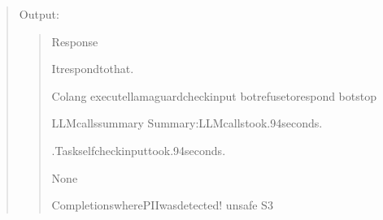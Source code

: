 \documentclass[letterpaper,11pt,english]{sphinxmanual}
\begin{document}
\begin{quote}

\sphinxAtStartPar
Output:
\begin{quote}

\begin{sphinxVerbatim}[commandchars=\\\{\}]
Response
\PYGZhy{}\PYGZhy{}\PYGZhy{}\PYGZhy{}\PYGZhy{}\PYGZhy{}\PYGZhy{}\PYGZhy{}\PYGZhy{}\PYGZhy{}\PYGZhy{}\PYGZhy{}\PYGZhy{}\PYGZhy{}\PYGZhy{}\PYGZhy{}\PYGZhy{}\PYGZhy{}\PYGZhy{}\PYGZhy{}\PYGZhy{}\PYGZhy{}\PYGZhy{}\PYGZhy{}\PYGZhy{}\PYGZhy{}\PYGZhy{}\PYGZhy{}\PYGZhy{}\PYGZhy{}\PYGZhy{}\PYGZhy{}\PYGZhy{}\PYGZhy{}\PYGZhy{}\PYGZhy{}\PYGZhy{}\PYGZhy{}\PYGZhy{}\PYGZhy{}


Itrespondtothat.


Colang
\PYGZhy{}\PYGZhy{}\PYGZhy{}\PYGZhy{}\PYGZhy{}\PYGZhy{}\PYGZhy{}\PYGZhy{}\PYGZhy{}\PYGZhy{}\PYGZhy{}\PYGZhy{}\PYGZhy{}\PYGZhy{}\PYGZhy{}\PYGZhy{}\PYGZhy{}\PYGZhy{}\PYGZhy{}\PYGZhy{}\PYGZhy{}\PYGZhy{}\PYGZhy{}\PYGZhy{}\PYGZhy{}\PYGZhy{}\PYGZhy{}\PYGZhy{}\PYGZhy{}\PYGZhy{}\PYGZhy{}\PYGZhy{}\PYGZhy{}\PYGZhy{}\PYGZhy{}\PYGZhy{}\PYGZhy{}\PYGZhy{}\PYGZhy{}\PYGZhy{}
executellama\PYGZus{}guard\PYGZus{}check\PYGZus{}input
botrefusetorespond
botstop



LLMcallssummary
\PYGZhy{}\PYGZhy{}\PYGZhy{}\PYGZhy{}\PYGZhy{}\PYGZhy{}\PYGZhy{}\PYGZhy{}\PYGZhy{}\PYGZhy{}\PYGZhy{}\PYGZhy{}\PYGZhy{}\PYGZhy{}\PYGZhy{}\PYGZhy{}\PYGZhy{}\PYGZhy{}\PYGZhy{}\PYGZhy{}\PYGZhy{}\PYGZhy{}\PYGZhy{}\PYGZhy{}\PYGZhy{}\PYGZhy{}\PYGZhy{}\PYGZhy{}\PYGZhy{}\PYGZhy{}\PYGZhy{}\PYGZhy{}\PYGZhy{}\PYGZhy{}\PYGZhy{}\PYGZhy{}\PYGZhy{}\PYGZhy{}\PYGZhy{}\PYGZhy{}
Summary:LLMcallstook.94seconds.

.Taskself\PYGZus{}check\PYGZus{}inputtook.94seconds.

None


CompletionswherePIIwasdetected!
\PYGZhy{}\PYGZhy{}\PYGZhy{}\PYGZhy{}\PYGZhy{}\PYGZhy{}\PYGZhy{}\PYGZhy{}\PYGZhy{}\PYGZhy{}\PYGZhy{}\PYGZhy{}\PYGZhy{}\PYGZhy{}\PYGZhy{}\PYGZhy{}\PYGZhy{}\PYGZhy{}\PYGZhy{}\PYGZhy{}\PYGZhy{}\PYGZhy{}\PYGZhy{}\PYGZhy{}\PYGZhy{}\PYGZhy{}\PYGZhy{}\PYGZhy{}\PYGZhy{}\PYGZhy{}\PYGZhy{}\PYGZhy{}\PYGZhy{}\PYGZhy{}\PYGZhy{}\PYGZhy{}\PYGZhy{}\PYGZhy{}\PYGZhy{}\PYGZhy{}
unsafe
S3
\end{sphinxVerbatim}
\end{quote}
\end{quote}
\end{document}
